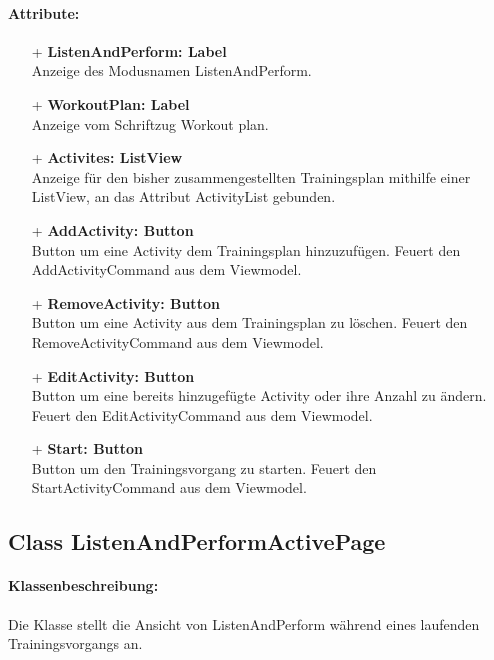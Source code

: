 \documentclass[a4paper,12pt]{article}
\begin{document}
\paragraph{Attribute:}
	\begin{itemize}
	\item[+] \textbf{ListenAndPerform: Label} \\ Anzeige des Modusnamen ListenAndPerform.
	\item[+] \textbf{WorkoutPlan: Label} \\ Anzeige vom Schriftzug Workout plan.
	\item[+] \textbf{Activites: ListView} \\	Anzeige für den bisher zusammengestellten Trainingsplan mithilfe einer ListView, an das Attribut ActivityList gebunden. 
	\item[+] \textbf{AddActivity: Button} \\ Button um eine Activity dem Trainingsplan hinzuzufügen. Feuert den AddActivityCommand aus dem Viewmodel.
	\item[+] \textbf{RemoveActivity: Button} \\ Button um eine Activity aus dem Trainingsplan zu löschen. Feuert den RemoveActivityCommand aus dem Viewmodel.
	\item[+] \textbf{EditActivity: Button} \\ Button um eine bereits hinzugefügte Activity oder ihre Anzahl zu ändern. Feuert den EditActivityCommand aus dem Viewmodel.
	\item[+] \textbf{Start: Button} \\ Button um den Trainingsvorgang zu starten. Feuert den StartActivityCommand aus dem Viewmodel.
	\end{itemize}

\subsection{Class ListenAndPerformActivePage}
\paragraph{Klassenbeschreibung:}
Die Klasse stellt die Ansicht von ListenAndPerform während eines laufenden Trainingsvorgangs an.
\end{document}
